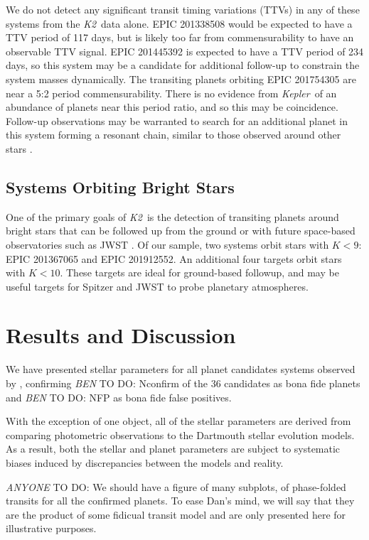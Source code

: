 \documentclass{emulateapj}
\newcommand{\project}[1]{\textsl{#1}}
\newcommand{\kep}{\project{Kepler}}
\newcommand{\KT}{\project{K2}}
\newcommand{\paperit}{\citet{Foreman-Mackey15}}
\newcommand{\todo}[3]{{\color{#2} \emph{#1} TO DO: #3}}
\newcommand{\btmtodo}[1]{\todo{BEN}{red}{#1}}
\newcommand{\anytodo}[1]{\todo{ANYONE}{NavyBlue}{#1}}
\begin{document}
We do not detect any significant transit timing variations (TTVs) in any of these systems from 
the \KT\ data alone. 
EPIC 201338508 would be expected to have a TTV period of 117 days, but 
is likely too far from commensurability to have an observable TTV signal. 
EPIC 201445392 is expected to have a TTV period of 234 days, so this system may be a candidate
for additional follow-up to constrain the system masses dynamically. 
The transiting planets orbiting EPIC 201754305 are near a 5:2 period commensurability. 
There is no evidence from \kep\ of an abundance of planets near this period ratio, and so this 
may be coincidence.
Follow-up observations may be warranted to search for an additional planet in this system 
forming a resonant chain, similar to those observed around other stars \citep[e.g.][]{Swift13,
Campante15}.

\subsection{Systems Orbiting Bright Stars}

One of the primary goals of \KT\ is the detection of transiting planets around bright stars that
can be followed up from the ground or with future space-based observatories such as JWST 
\citep{Howell14}. 
Of our sample, two systems orbit stars with $K < 9$: EPIC 201367065 \citep{Crossfield15} and
EPIC 201912552. 
An additional four targets orbit stars with $K <10$. 
These targets are ideal for ground-based followup, and may be useful targets for Spitzer and 
JWST to probe planetary atmospheres.

\section{Results and Discussion}

We have presented stellar parameters for all planet candidates systems observed by 
\paperit, confirming \btmtodo{Nconfirm} of the 36 candidates as bona fide planets and 
\btmtodo{NFP} as bona fide false positives. 

With the exception of one object, all of the stellar parameters are derived from comparing 
photometric observations to the Dartmouth stellar evolution models. 
As a result, both the stellar and planet parameters are subject to systematic biases induced
by discrepancies between the models and reality. 


\anytodo{We should have a figure of many subplots, of phase-folded
transits for all the confirmed planets. 
To ease Dan's mind, we will say that they are the product of 
some fidicual transit model and are only presented here for illustrative
purposes.}
\end{document}
